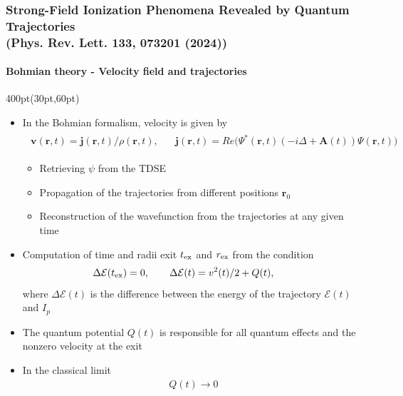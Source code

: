 \begin{frame}
\frametitle{Strong-Field Ionization Phenomena Revealed by Quantum Trajectories \\
\small (Phys. Rev. Lett. \textbf{133}, 073201 (2024))}
\framesubtitle{Bohmian theory - Velocity field and trajectories}


\footnotesize
 
\begin{textblock*}{400pt}(30pt,60pt)
\footnotesize
\begin{itemize}
\item In the Bohmian formalism, velocity is given by
\begin{align}
\begin{split}
 \boldsymbol{v}(\boldsymbol{r},t) 
   = \boldsymbol{j}(\boldsymbol{r},t) /  \rho(\boldsymbol{r},t), 
\hspace{20pt} 
\boldsymbol{j}(\boldsymbol{r},t) = Re\Bigg(\Psi^*(\boldsymbol{r},t)
\left( -i\Delta + \boldsymbol{A}(t)  \right) \Psi(\boldsymbol{r},t)\Bigg)
\nonumber
\end{split}
\end{align}
\begin{itemize}
\footnotesize
\item[$\bullet$] Retrieving $\psi$ from the TDSE
\item[$\bullet$] Propagation of the trajectories from different positions 
$\boldsymbol{r}_0$
\item[$\bullet$] Reconstruction of the wavefunction from the trajectories
at any given time
\end{itemize}
\item Computation of time and radii exit $t_{\rm ex}$ and $r_{\rm ex}$
from the condition
\begin{align}
\Delta \mathcal{E}(t_{\rm ex}) = 0, \hspace{20pt}
\Delta \mathcal{E}(t) = v^2(t)/2  + Q(t), \hspace{20pt} \nonumber
\end{align}
where  $\Delta \mathcal{E}(t)$ is the difference between the energy of 
the trajectory $\mathcal{E}(t)$ and $I_p$
\item The quantum potential $Q(t)$ is responsible for all quantum effects and the nonzero velocity at the exit 
\vspace{10pt}
\item In the classical limit 
\begin{align}
Q(t) \longrightarrow 0 \nonumber
\end{align}
\end{itemize}
\end{textblock*}




\end{frame}





